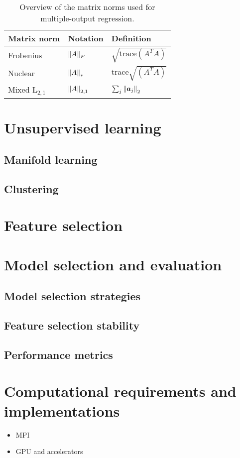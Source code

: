 		\begin{table}[htb]
			\centering
			\caption{Overview of the matrix norms used for multiple-output regression.}\label{tab:norms}
			\begin{tabular}{l|l|l}
				\toprule
				Matrix norm  & Notation         & Definition                      \\  \midrule
				Frobenius        & $\left\lVert A\right\rVert_F$     & $\sqrt{\text{trace}(A^TA)}$     \\ [0.05cm]
				Nuclear          & $\left\lVert A\right\rVert_*$     & $\text{trace}\sqrt{(A^TA)}$     \\ [0.05cm]
				Mixed $\text{L}_{2,1}$        & $\left\lVert A\right\rVert_{2,1}$ & $\sum_{j}\left\lVert\bm{a}_j\right\rVert_2$ \\ \bottomrule
			\end{tabular}
		\end{table}




  \section{Unsupervised learning} \label{subsec:unsupervised_learning}
    \subsection{Manifold learning}
    \subsection{Clustering}

  \section{Feature selection} \label{subsec:feature_selection}

  \section{Model selection and evaluation} \label{subsec:model_selection}
    \subsection{Model selection strategies}
    \subsection{Feature selection stability}
    \subsection{Performance metrics}


\section{Computational requirements and implementations} \label{sec:implementation}
\begin{itemize}
  \item MPI
  \item GPU and accelerators
\end{itemize}
